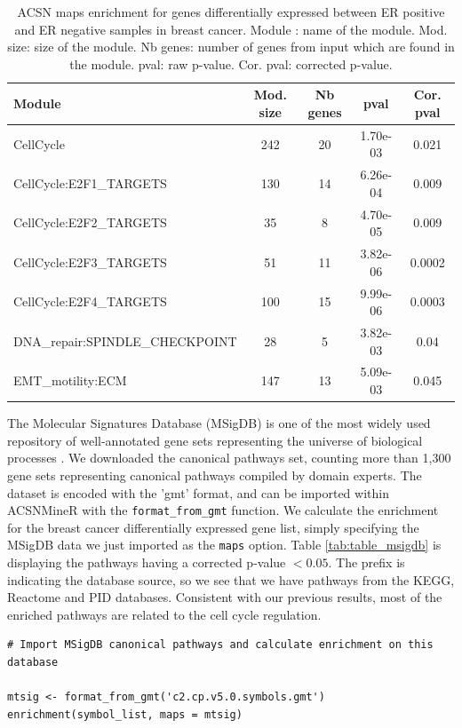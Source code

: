 \documentclass{article}
\begin{document}
\begin{table}[h!]
  \centering
  \caption{ACSN maps enrichment for genes differentially expressed between ER
positive and ER negative samples in breast cancer.  Module : name of the
module. Mod. size: size of the module. Nb genes: number of genes from input
which are found in the module. pval: raw p-value. Cor. pval: corrected p-value.}
\label{tab:table_mainz}

\begin{tabular}{l c c c c}
\hline
Module & Mod. size & Nb genes & pval & Cor. pval\\
\hline
CellCycle & 242 & 20 & 1.70e-03 & 0.021 \\
CellCycle:E2F1\_TARGETS & 130 & 14 & 6.26e-04 & 0.009 \\
CellCycle:E2F2\_TARGETS & 35 & 8 & 4.70e-05 & 0.009 \\
CellCycle:E2F3\_TARGETS & 51 & 11 & 3.82e-06 & 0.0002 \\
CellCycle:E2F4\_TARGETS & 100 & 15 & 9.99e-06 & 0.0003 \\
DNA\_repair:SPINDLE\_CHECKPOINT & 28 & 5 & 3.82e-03 & 0.04 \\
EMT\_motility:ECM & 147 & 13 & 5.09e-03 & 0.045 \\
\hline
\end{tabular}
\end{table}

The Molecular Signatures Database (MSigDB) is one of the most widely used
repository of well-annotated  gene sets representing the universe of biological
processes \cite{liberzon2011molecular}. We downloaded the canonical pathways
set, counting more than 1,300 gene sets representing canonical pathways compiled
by domain experts. The dataset is encoded with the 'gmt' format, and can be
imported within ACSNMineR with the \verb|format_from_gmt| function. We
calculate the enrichment for the breast cancer differentially expressed gene
list, simply specifying the MSigDB data we just imported as the \verb|maps|
option. Table \ref{tab:table_msigdb} is displaying the pathways having a
corrected p-value $< 0.05$. The prefix is indicating the database source, so we
see that we have pathways from the KEGG, Reactome and PID databases. Consistent
with our previous results, most of the enriched pathways are related to the cell
cycle regulation. 


\begin{verbatim}
# Import MSigDB canonical pathways and calculate enrichment on this database 

mtsig <- format_from_gmt('c2.cp.v5.0.symbols.gmt')
enrichment(symbol_list, maps = mtsig)

\end{verbatim}
\end{document}
